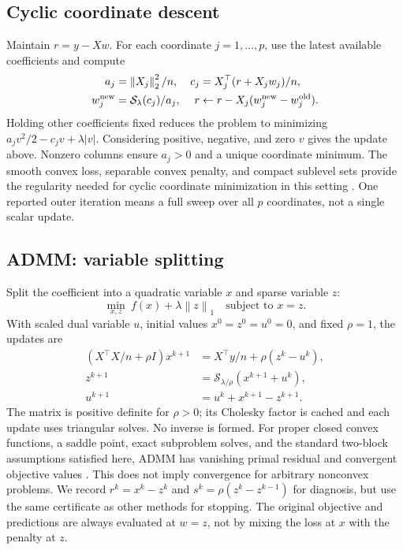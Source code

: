 \documentclass{article}
\newcommand{\norm}[1]{\left\|#1\right\|}
\newcommand{\soft}{\mathcal{S}}
\begin{document}
\subsection{Cyclic coordinate descent}
Maintain $r=y-Xw$. For each coordinate $j=1,\ldots,p$, use the latest available coefficients and compute
\begin{align}
 a_j&=\norm{X_j}_2^2/n,&c_j&=X_j^\top(r+X_jw_j)/n,\\
 w_j^{\rm new}&=\soft_\lambda(c_j)/a_j,&
 r&\leftarrow r-X_j(w_j^{\rm new}-w_j^{\rm old}).
\end{align}
Holding other coefficients fixed reduces the problem to minimizing $a_jv^2/2-c_jv+\lambda|v|$. Considering positive, negative, and zero $v$ gives the update above. Nonzero columns ensure $a_j>0$ and a unique coordinate minimum. The smooth convex loss, separable convex penalty, and compact sublevel sets provide the regularity needed for cyclic coordinate minimization in this setting \citep{tseng2001}. One reported outer iteration means a full sweep over all $p$ coordinates, not a single scalar update.

\subsection{ADMM: variable splitting}
Split the coefficient into a quadratic variable $x$ and sparse variable $z$:
\begin{equation}
 \min_{x,z}\ f(x)+\lambda\norm{z}_1\quad\text{subject to }x=z.
\end{equation}
With scaled dual variable $u$, initial values $x^0=z^0=u^0=0$, and fixed $\rho=1$, the updates are
\begin{align}
 (X^\top X/n+\rho I)x^{k+1}&=X^\top y/n+\rho(z^k-u^k),\\
 z^{k+1}&=\soft_{\lambda/\rho}(x^{k+1}+u^k),\\
 u^{k+1}&=u^k+x^{k+1}-z^{k+1}.
\end{align}
The matrix is positive definite for $\rho>0$; its Cholesky factor is cached and each update uses triangular solves. No inverse is formed. For proper closed convex functions, a saddle point, exact subproblem solves, and the standard two-block assumptions satisfied here, ADMM has vanishing primal residual and convergent objective values \citep{boyd2011}. This does not imply convergence for arbitrary nonconvex problems. We record $r^k=x^k-z^k$ and $s^k=\rho(z^k-z^{k-1})$ for diagnosis, but use the same certificate as other methods for stopping. The original objective and predictions are always evaluated at $w=z$, not by mixing the loss at $x$ with the penalty at $z$.
\end{document}

